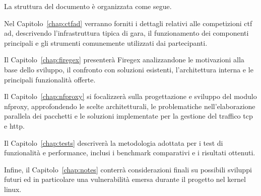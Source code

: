 La struttura del documento è organizzata come segue. 

Nel Capitolo~\ref{chap:ctfad} verranno forniti i dettagli relativi alle competizioni \gls{ctf} \gls{ad}, descrivendo l'infrastruttura tipica di gara, il funzionamento dei componenti principali e gli strumenti comunemente utilizzati dai partecipanti.

Il Capitolo~\ref{chap:firegex} presenterà Firegex analizzandone le motivazioni alla base dello sviluppo, il confronto con soluzioni esistenti, l'architettura interna e le principali funzionalità offerte.

Il Capitolo~\ref{chap:nfproxy} si focalizzerà sulla progettazione e sviluppo del modulo nfproxy, approfondendo le scelte architetturali, le problematiche nell'elaborazione parallela dei pacchetti e le soluzioni implementate per la gestione del traffico \gls{tcp} e \gls{http}.

Il Capitolo~\ref{chap:tests} descriverà la metodologia adottata per i test di funzionalità e performance, inclusi i benchmark comparativi e i risultati ottenuti.

Infine, il Capitolo~\ref{chap:notes} conterrà considerazioni finali su possibili sviluppi futuri ed in particolare una vulnerabilità emersa durante il progetto nel kernel linux.

